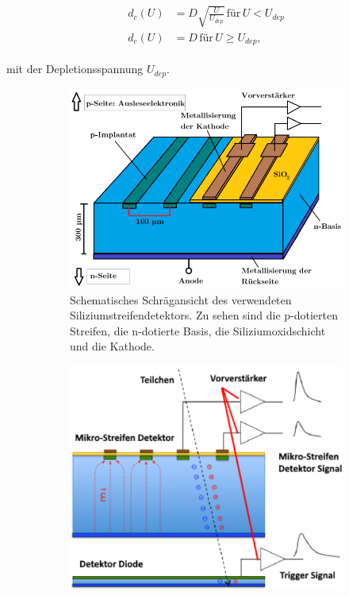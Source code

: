 \begin{align}
  \begin{split}
    d_c(U) &= D \sqrt{\frac{U}{U_{dep}}} \,\text{für}\, U < U_{dep} \\
    d_c(U) &= D  \,\text{für}\, U \geq U_{dep},
  \end{split}
\end{align}

mit der Depletionsspannung $U_{dep}$.


\begin{figure}
  \begin{subfigure}{0.45\textwidth}
    \centering
    \includegraphics[width=\linewidth]{content/graphics/schrag.png}
    \caption{Schematisches Schrägansicht des verwendeten Siliziumstreifendetektors. Zu sehen sind die p-dotierten Streifen, die n-dotierte Basis, die Siliziumoxidschicht und die Kathode.}
    \label{fig:schragansicht}
  \end{subfigure}%
  \begin{subfigure}{0.45\textwidth}
    \centering
    \includegraphics[width=\linewidth]{content/graphics/trig.png}

\end{subfigure}
\end{figure}

